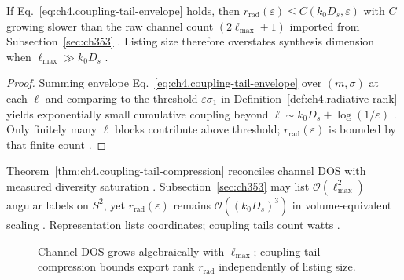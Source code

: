 \begin{theorem}
\label{thm:ch4.coupling-tail-compression}
If Eq.~\eqref{eq:ch4.coupling-tail-envelope} holds, then
\(r_{\mathrm{rad}}(\varepsilon)\le C(k_{0}D_{s},\varepsilon)\) with \(C\) growing slower than the raw channel count
\((2\ell_{\max}+1)\) imported from Subsection~\ref{sec:ch353} \cite{hansen1988,stratton1941,harrington2001}. Listing size therefore
overstates synthesis dimension when \(\ell_{\max}\gg k_{0}D_{s}\) \cite{devaney2004,jackson1999}.
\end{theorem}
\begin{proof}
Summing envelope Eq.~\eqref{eq:ch4.coupling-tail-envelope} over \((m,\sigma)\) at each \(\ell\) and comparing to the threshold
\(\varepsilon\sigma_{1}\) in Definition~\ref{def:ch4.radiative-rank} yields exponentially small cumulative coupling beyond
\(\ell\sim k_{0}D_{s}+\log(1/\varepsilon)\) \cite{hansen1988,harrington2001,stratton1941}. Only finitely many \(\ell\) blocks contribute
above threshold; \(r_{\mathrm{rad}}(\varepsilon)\) is bounded by that finite count \cite{devaney2004}.
\end{proof}

Theorem~\ref{thm:ch4.coupling-tail-compression} reconciles channel DOS with measured diversity saturation \cite{hansen1988}. Subsection~\ref{sec:ch353}
may list \(\mathcal{O}(\ell_{\max}^{2})\) angular labels on \(S^{2}\), yet \(r_{\mathrm{rad}}(\varepsilon)\) remains
\(\mathcal{O}((k_{0}D_{s})^{3})\) in volume-equivalent scaling \cite{jackson1999,harrington2001,devaney2004}. Representation lists
coordinates; coupling tails count watts \cite{stratton1941,collin2001}.

\begin{figure}[t]
\centering
{}
\caption{Channel DOS grows algebraically with \(\ell_{\max}\); coupling tail compression bounds export rank \(r_{\mathrm{rad}}\) independently of listing size.}
\label{fig:ch4.coupling-tail-compression}
\end{figure}

